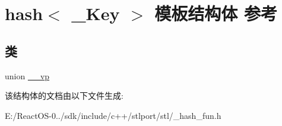 \hypertarget{structhash}{}\section{hash$<$ \+\_\+\+Key $>$ 模板结构体 参考}
\label{structhash}
\subsection*{类}
\begin{DoxyCompactItemize}
\item 
union \hyperlink{unionhash_3_01void_01_5_01_4_1_1____vp}{\+\_\+\+\_\+vp}
\end{DoxyCompactItemize}


该结构体的文档由以下文件生成\+:\begin{DoxyCompactItemize}
\item 
E\+:/\+React\+O\+S-\/0../sdk/include/c++/stlport/stl/\+\_\+hash\+\_\+fun.\+h\end{DoxyCompactItemize}
